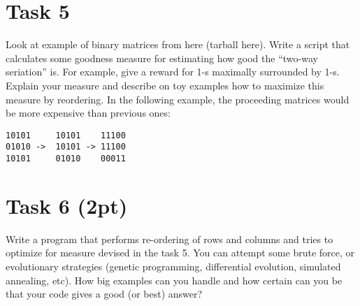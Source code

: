 \documentclass{article}
\begin{document}
\section*{Task 5}
Look at example of binary matrices from here (tarball here). Write a script that calculates some goodness measure for estimating how good the “two-way seriation” is. For example, give a reward for 1-s maximally surrounded by 1-s. Explain your measure and describe on toy examples how to maximize this measure by reordering. In the following example, the proceeding matrices would be more expensive than previous ones:
\begin{verbatim}
10101     10101    11100
01010 ->  10101 -> 11100
10101     01010    00011 
\end{verbatim}


\section*{Task 6 (2pt)}
Write a program that performs re-ordering of rows and columns and tries to optimize for measure devised in the task 5. You can attempt some brute force, or evolutionary strategies (genetic programming, differential evolution, simulated annealing, etc). How big examples can you handle and how certain can you be that your code gives a good (or best) answer?
\end{document}
